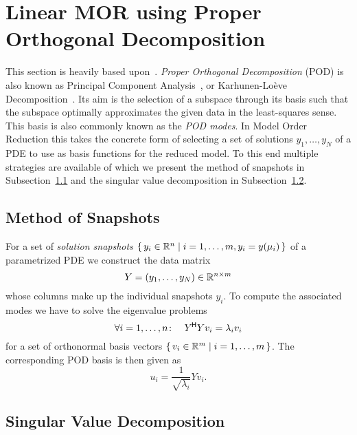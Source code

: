 \section{Linear MOR using Proper Orthogonal Decomposition}\label{sec:pod}

This section is heavily based upon~\cite{Pinnau2008}.
\emph{Proper Orthogonal Decomposition} (POD) is also known as Principal Component Analysis~\cite{Hotelling1936}, or Karhunen-Loève Decomposition~\cite{Karhunen1946}.
Its aim is the selection of a subspace through its basis such that the subspace optimally approximates the given data in the least-squares sense.
This basis is also commonly known as the \emph{POD modes}.
In Model Order Reduction this takes the concrete form of selecting a set of solutions $y_1, \dots, y_N$ of a PDE to use as basis functions for the reduced model.
To this end multiple strategies are available of which we present the method of snapshots in Subsection~\ref{subsec:pod-snapshots} and the singular value decomposition in Subsection~\ref{subsec:pod-svd}.

\subsection{Method of Snapshots}\label{subsec:pod-snapshots}

For a set of \emph{solution snapshots} $\left\{\,y_i \in \mathbb{R}^n\mid i = 1, \dots, m, y_i = y(\mu_i)\,\right\}$ of a parametrized PDE we construct the data matrix
\begin{equation}\label{eq:pod-data-matrix}
    Y = \left( y_1, \dots, y_N \right) \in \mathbb{R}^{n \times m}
\end{equation}
whose columns make up the individual snapshots $y_i$.
To compute the associated modes we have to solve the eigenvalue problems
\begin{equation*}
    \forall i = 1, \dots, n \colon\quad Y^{\mkern-1.5mu \mathsf{H}} Y v_i = \lambda_i v_i
\end{equation*}
for a set of orthonormal basis vectors $\left\{\,v_i \in \mathbb{R}^m\mid i = 1, \dots, m\,\right\}$.
The corresponding POD basis is then given as
\begin{equation*}
    u_i = \frac{1}{\sqrt{\lambda_i}} Y v_i.
\end{equation*}

\subsection{Singular Value Decomposition}\label{subsec:pod-svd}

